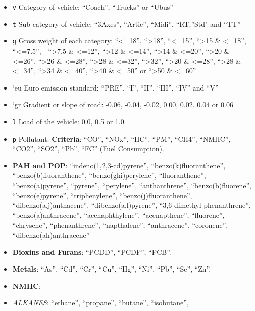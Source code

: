 \documentclass[12pt,graybox,envcountchap,sectrefs]{krantz}
\providecommand{\tightlist}{%
  \setlength{\itemsep}{0pt}\setlength{\parskip}{0pt}}
\theoremstyle{definition}
\theoremstyle{definition}
\theoremstyle{definition}
\theoremstyle{remark}
\begin{document}
\begin{itemize}
\tightlist
\item
  \texttt{v} Category of vehicle: ``Coach'', ``Trucks'' or ``Ubus''
\item
  \texttt{t} Sub-category of vehicle: ``3Axes'', ``Artic'', ``Midi'',
  ``RT,''Std" and ``TT''
\item
  \texttt{g} Gross weight of each category: ``\textless{}=18'',
  ``\textgreater{}18'', ``\textless{}=15'', ``\textgreater{}15 \&
  \textless{}=18'', ``\textless{}=7.5'', - ``\textgreater{}7.5 \&
  \textless{}=12'', ``\textgreater{}12 \& \textless{}=14'',
  ``\textgreater{}14 \& \textless{}=20'', ``\textgreater{}20 \&
  \textless{}=26'', ``\textgreater{}26 \& \textless{}=28'',
  ``\textgreater{}28 \& \textless{}=32'', ``\textgreater{}32'',
  ``\textgreater{}20 \& \textless{}=28'', ``\textgreater{}28 \&
  \textless{}=34'', ``\textgreater{}34 \& \textless{}=40'',
  ``\textgreater{}40 \& \textless{}=50'' or ``\textgreater{}50 \&
  \textless{}=60''
\item
  `eu Euro emission standard: ``PRE'', ``I'', ``II'', ``III'', ``IV''
  and ``V''
\item
  `gr Gradient or slope of road: -0.06, -0.04, -0.02, 0.00, 0.02. 0.04
  or 0.06
\item
  \texttt{l} Load of the vehicle: 0.0, 0.5 or 1.0
\item
  \texttt{p} Pollutant: \textbf{Criteria}: ``CO'', ``NOx'', ``HC'',
  ``PM'', ``CH4'', ``NMHC'', ``CO2'', ``SO2'', ``Pb'', ``FC'' (Fuel
  Consumption).
\item
  \textbf{PAH and POP}: ``indeno(1,2,3-cd)pyrene'',
  ``benzo(k)fluoranthene'', ``benzo(b)fluoranthene'',
  ``benzo(ghi)perylene'', ``fluoranthene'', ``benzo(a)pyrene'',
  ``pyrene'', ``perylene'', ``anthanthrene'', ``benzo(b)fluorene'',
  ``benzo(e)pyrene'', ``triphenylene'', ``benzo(j)fluoranthene'',
  ``dibenzo(a,j)anthacene'', ``dibenzo(a,l)pyrene'',
  ``3,6-dimethyl-phenanthrene'', ``benzo(a)anthracene'',
  ``acenaphthylene'', ``acenapthene'', ``fluorene'', ``chrysene'',
  ``phenanthrene'', ``napthalene'', ``anthracene'', ``coronene'',
  ``dibenzo(ah)anthracene''
\item
  \textbf{Dioxins and Furans}: ``PCDD'', ``PCDF'', ``PCB''.
\item
  \textbf{Metals}: ``As'', ``Cd'', ``Cr'', ``Cu'', ``Hg'', ``Ni'',
  ``Pb'', ``Se'', ``Zn''.
\item
  \textbf{NMHC}:
\item
  \emph{ALKANES}: ``ethane'', ``propane'', ``butane'', ``isobutane'',

\end{itemize}
\end{document}
